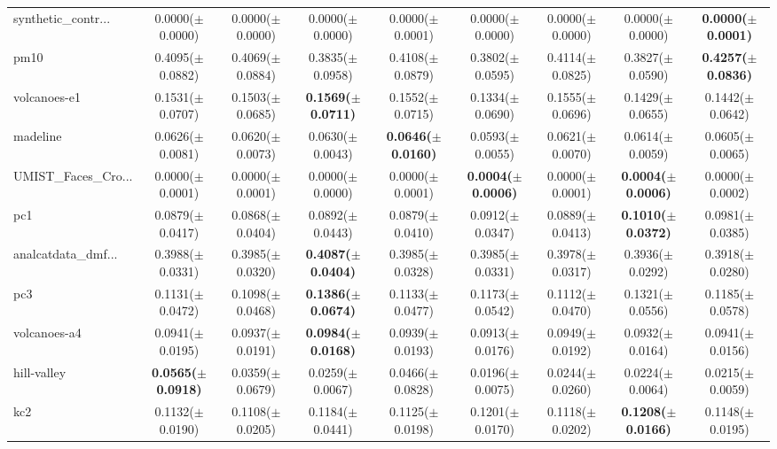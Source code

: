 \begin{longtable}{lcccccccc}
synthetic\_contr... & 0.0000($\pm$0.0000) & 0.0000($\pm$0.0000) & 0.0000($\pm$0.0000) & 0.0000($\pm$0.0001) & 0.0000($\pm$0.0000) & 0.0000($\pm$0.0000) & 0.0000($\pm$0.0000) & \textbf{0.0000($\pm$0.0001)} \\
pm10 & 0.4095($\pm$0.0882) & 0.4069($\pm$0.0884) & 0.3835($\pm$0.0958) & 0.4108($\pm$0.0879) & 0.3802($\pm$0.0595) & 0.4114($\pm$0.0825) & 0.3827($\pm$0.0590) & \textbf{0.4257($\pm$0.0836)} \\
volcanoes-e1 & 0.1531($\pm$0.0707) & 0.1503($\pm$0.0685) & \textbf{0.1569($\pm$0.0711)} & 0.1552($\pm$0.0715) & 0.1334($\pm$0.0690) & 0.1555($\pm$0.0696) & 0.1429($\pm$0.0655) & 0.1442($\pm$0.0642) \\
madeline & 0.0626($\pm$0.0081) & 0.0620($\pm$0.0073) & 0.0630($\pm$0.0043) & \textbf{0.0646($\pm$0.0160)} & 0.0593($\pm$0.0055) & 0.0621($\pm$0.0070) & 0.0614($\pm$0.0059) & 0.0605($\pm$0.0065) \\
UMIST\_Faces\_Cro... & 0.0000($\pm$0.0001) & 0.0000($\pm$0.0001) & 0.0000($\pm$0.0000) & 0.0000($\pm$0.0001) & \textbf{0.0004($\pm$0.0006)} & 0.0000($\pm$0.0001) & \textbf{0.0004($\pm$0.0006)} & 0.0000($\pm$0.0002) \\
pc1 & 0.0879($\pm$0.0417) & 0.0868($\pm$0.0404) & 0.0892($\pm$0.0443) & 0.0879($\pm$0.0410) & 0.0912($\pm$0.0347) & 0.0889($\pm$0.0413) & \textbf{0.1010($\pm$0.0372)} & 0.0981($\pm$0.0385) \\
analcatdata\_dmf... & 0.3988($\pm$0.0331) & 0.3985($\pm$0.0320) & \textbf{0.4087($\pm$0.0404)} & 0.3985($\pm$0.0328) & 0.3985($\pm$0.0331) & 0.3978($\pm$0.0317) & 0.3936($\pm$0.0292) & 0.3918($\pm$0.0280) \\
pc3 & 0.1131($\pm$0.0472) & 0.1098($\pm$0.0468) & \textbf{0.1386($\pm$0.0674)} & 0.1133($\pm$0.0477) & 0.1173($\pm$0.0542) & 0.1112($\pm$0.0470) & 0.1321($\pm$0.0556) & 0.1185($\pm$0.0578) \\
volcanoes-a4 & 0.0941($\pm$0.0195) & 0.0937($\pm$0.0191) & \textbf{0.0984($\pm$0.0168)} & 0.0939($\pm$0.0193) & 0.0913($\pm$0.0176) & 0.0949($\pm$0.0192) & 0.0932($\pm$0.0164) & 0.0941($\pm$0.0156) \\
hill-valley & \textbf{0.0565($\pm$0.0918)} & 0.0359($\pm$0.0679) & 0.0259($\pm$0.0067) & 0.0466($\pm$0.0828) & 0.0196($\pm$0.0075) & 0.0244($\pm$0.0260) & 0.0224($\pm$0.0064) & 0.0215($\pm$0.0059) \\
kc2 & 0.1132($\pm$0.0190) & 0.1108($\pm$0.0205) & 0.1184($\pm$0.0441) & 0.1125($\pm$0.0198) & 0.1201($\pm$0.0170) & 0.1118($\pm$0.0202) & \textbf{0.1208($\pm$0.0166)} & 0.1148($\pm$0.0195) \\

\end{longtable}

